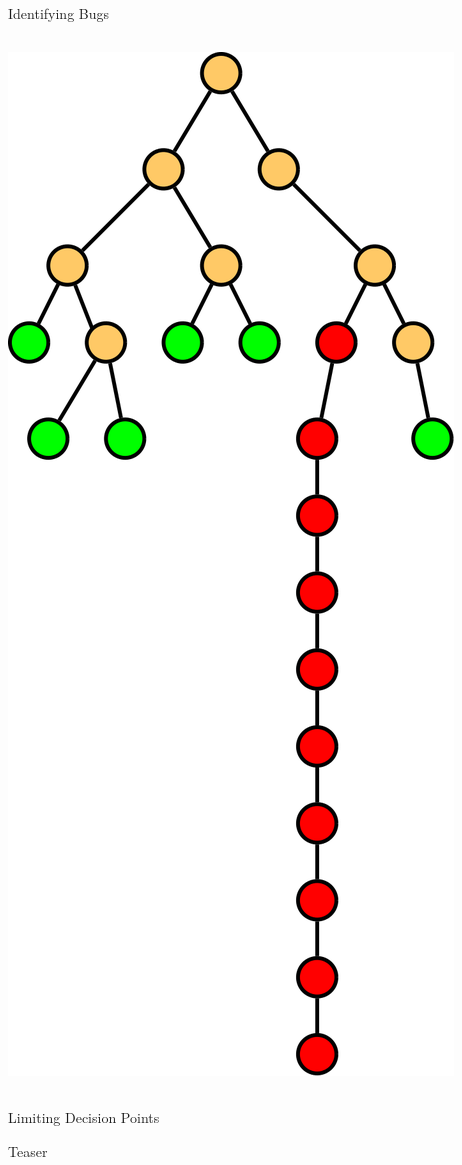 \documentclass[xcolor=dvipsnames]{beamer}
\begin{document}
\begin{frame}[fragile]{Identifying Bugs}
\begin{columns}[l]
		\includegraphics[width=\textwidth]{livelock.png}
	\end{columns}
\end{frame}
\begin{frame}{Limiting Decision Points}
\end{frame}
\begin{frame}{Teaser}
\end{frame}
\end{document}
